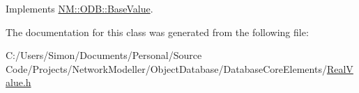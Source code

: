 Implements \hyperlink{class_n_m_1_1_o_d_b_1_1_base_value_a343cd72d2116513509db379f6faab465}{N\+M\+::\+O\+D\+B\+::\+Base\+Value}.



The documentation for this class was generated from the following file\+:\begin{DoxyCompactItemize}
\item 
C\+:/\+Users/\+Simon/\+Documents/\+Personal/\+Source Code/\+Projects/\+Network\+Modeller/\+Object\+Database/\+Database\+Core\+Elements/\hyperlink{_real_value_8h}{Real\+Value.\+h}\end{DoxyCompactItemize}
